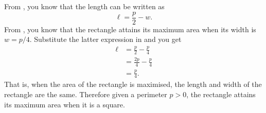 \documentclass[a4paper,oneside,12pt]{article}
\begin{document}
\begin{problem}
{\begin{solution}
From , you know that the length can
be written as
\begin{equation}
\label{eqn:rectangle_length_as_width_and_perimeter}
\ell
=
\frac{p}{2} - w.
\end{equation}
From , you know that the
rectangle attains its maximum area when its width is $w = p / 4$.
Substitute the latter expression in
 and you get
\begin{align*}
\ell
&=
\frac{p}{2} - \frac{p}{4} \\[4pt]
&=
\frac{2p}{4} - \frac{p}{4} \\[4pt]
&=
\frac{p}{4}.
\end{align*}
That is, when the area of the rectangle is maximised, the length and
width of the rectangle are the same.  Therefore given a perimeter
$p > 0$, the rectangle attains its maximum area when it is a square.
\end{solution}
}{}


\end{problem}
\end{document}

